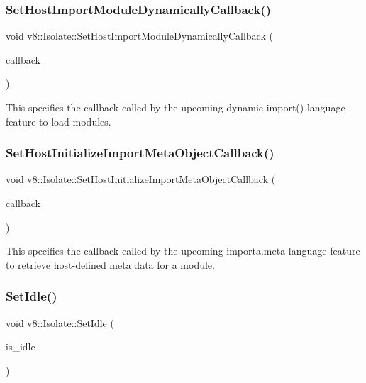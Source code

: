 \subsubsection{\texorpdfstring{Set\+Host\+Import\+Module\+Dynamically\+Callback()}{SetHostImportModuleDynamicallyCallback()}}
{\footnotesize\ttfamily void v8\+::\+Isolate\+::\+Set\+Host\+Import\+Module\+Dynamically\+Callback (\begin{DoxyParamCaption}\item[{\mbox{\hyperlink{namespacev8_a327d89ea1fb89b4ada3571a3571413cc}{Host\+Import\+Module\+Dynamically\+Callback}}}]{callback }\end{DoxyParamCaption})}

This specifies the callback called by the upcoming dynamic import() language feature to load modules. \mbox{\label{classv8_1_1Isolate_ad5525cb1e8d0722df9cf1d163204c765}} 
\subsubsection{\texorpdfstring{Set\+Host\+Initialize\+Import\+Meta\+Object\+Callback()}{SetHostInitializeImportMetaObjectCallback()}}
{\footnotesize\ttfamily void v8\+::\+Isolate\+::\+Set\+Host\+Initialize\+Import\+Meta\+Object\+Callback (\begin{DoxyParamCaption}\item[{\mbox{\hyperlink{namespacev8_a46fe0379312fafd495b9be892b2de443}{Host\+Initialize\+Import\+Meta\+Object\+Callback}}}]{callback }\end{DoxyParamCaption})}

This specifies the callback called by the upcoming importa.\+meta language feature to retrieve host-\/defined meta data for a module. \mbox{\label{classv8_1_1Isolate_a9b5a3d4caed212eabb58a2b0a54e7a5d}} 
\subsubsection{\texorpdfstring{Set\+Idle()}{SetIdle()}}
{\footnotesize\ttfamily void v8\+::\+Isolate\+::\+Set\+Idle (\begin{DoxyParamCaption}\item[{bool}]{is\+\_\+idle }\end{DoxyParamCaption})}

